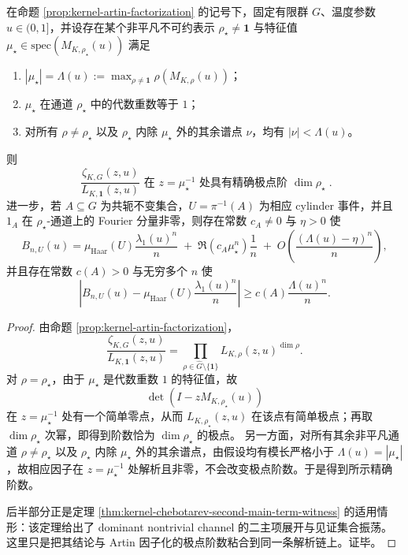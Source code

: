 \begin{theorem}\label{thm:kernel-artin-dominant-channel-pole-order}
在命题 \ref{prop:kernel-artin-factorization} 的记号下，固定有限群 \(G\)、温度参数 \(u\in(0,1]\)，并设存在某个非平凡不可约表示 \(\rho_\star\neq \mathbf{1}\) 与特征值 \(\mu_\star\in\mathrm{spec}(M_{K,\rho_\star}(u))\) 满足
\begin{enumerate}
  \item \(|\mu_\star|=\Lambda(u):=\max_{\rho\neq \mathbf{1}}\rho(M_{K,\rho}(u))\)；
  \item \(\mu_\star\) 在通道 \(\rho_\star\) 中的代数重数等于 \(1\)；
  \item 对所有 \(\rho\neq \rho_\star\) 以及 \(\rho_\star\) 内除 \(\mu_\star\) 外的其余谱点 \(\nu\)，均有 \(|\nu|<\Lambda(u)\)。
\end{enumerate}
则
\[
\boxed{\;
\frac{\zeta_{K,G}(z,u)}{L_{K,\mathbf{1}}(z,u)}
\text{ 在 }z=\mu_\star^{-1}\text{ 处具有精确极点阶 }\dim\rho_\star\; }.
\]
进一步，若 \(A\subseteq G\) 为共轭不变集合，\(U=\pi^{-1}(A)\) 为相应 cylinder 事件，并且 \(1_A\) 在 \(\rho_\star\)-通道上的 Fourier 分量非零，则存在常数 \(c_A\neq 0\) 与 \(\eta>0\) 使
\[
B_{n,U}(u)
=
\mu_{\mathrm{Haar}}(U)\frac{\lambda_1(u)^n}{n}
\;+\;
\Re(c_A\mu_\star^n)\frac{1}{n}
\;+\;
O\!\left(\frac{(\Lambda(u)-\eta)^n}{n}\right),
\]
并且存在常数 \(c(A)>0\) 与无穷多个 \(n\) 使
\[
\left|B_{n,U}(u)-\mu_{\mathrm{Haar}}(U)\frac{\lambda_1(u)^n}{n}\right|
\ge
c(A)\frac{\Lambda(u)^n}{n}.
\]
\end{theorem}

\begin{proof}
由命题 \ref{prop:kernel-artin-factorization}，
\[
\frac{\zeta_{K,G}(z,u)}{L_{K,\mathbf{1}}(z,u)}
=
\prod_{\rho\in\widehat G\setminus\{\mathbf{1}\}}L_{K,\rho}(z,u)^{\dim\rho}.
\]
对 \(\rho=\rho_\star\)，由于 \(\mu_\star\) 是代数重数 \(1\) 的特征值，故
\[
\det(I-zM_{K,\rho_\star}(u))
\]
在 \(z=\mu_\star^{-1}\) 处有一个简单零点，从而 \(L_{K,\rho_\star}(z,u)\) 在该点有简单极点；再取 \(\dim\rho_\star\) 次幂，即得到阶数恰为 \(\dim\rho_\star\) 的极点。
另一方面，对所有其余非平凡通道 \(\rho\neq \rho_\star\) 以及 \(\rho_\star\) 内除 \(\mu_\star\) 外的其余谱点，由假设均有模长严格小于 \(\Lambda(u)=|\mu_\star|\)，故相应因子在 \(z=\mu_\star^{-1}\) 处解析且非零，不会改变极点阶数。于是得到所示精确阶数。
\par
后半部分正是定理 \ref{thm:kernel-chebotarev-second-main-term-witness} 的适用情形：该定理给出了 dominant nontrivial channel 的二主项展开与见证集合振荡。这里只是把其结论与 Artin 因子化的极点阶数粘合到同一条解析链上。证毕。
\end{proof}

